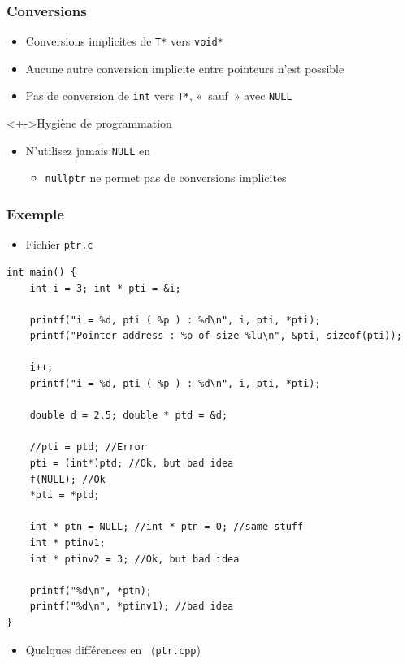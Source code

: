 \begin{frame}
\frametitle{Conversions}
\begin{itemize}[<+->]
\item Conversions implicites de \texttt{T*} vers \lstinline|void*|
\item Aucune autre conversion implicite entre pointeurs n'est possible
\item Pas de conversion de \lstinline|int| vers \texttt{T*}, «~sauf~» avec \lstinline|NULL|
\end{itemize}
\begin{block}<+->{Hygiène de programmation}
	\begin{itemize}[<+->]
	\item N'utilisez jamais \lstinline|NULL| en \cpp
		\begin{itemize}
		\item \lstinline|nullptr| ne permet pas de conversions implicites
		\end{itemize}
	\end{itemize}
\end{block}
\end{frame}

\begin{frame}[containsverbatim]
\frametitle{Exemple}
\begin{itemize}
\item Fichier \texttt{ptr.c}
\end{itemize}
\begin{lstlisting}
int main() {
    int i = 3; int * pti = &i;

    printf("i = %d, pti ( %p ) : %d\n", i, pti, *pti);
    printf("Pointer address : %p of size %lu\n", &pti, sizeof(pti));

    i++;
    printf("i = %d, pti ( %p ) : %d\n", i, pti, *pti);

    double d = 2.5; double * ptd = &d;
	
    //pti = ptd; //Error
    pti = (int*)ptd; //Ok, but bad idea
    f(NULL); //Ok
    *pti = *ptd;

    int * ptn = NULL; //int * ptn = 0; //same stuff
    int * ptinv1;
    int * ptinv2 = 3; //Ok, but bad idea

    printf("%d\n", *ptn);
    printf("%d\n", *ptinv1); //bad idea
}
\end{lstlisting}
\begin{itemize}
\item Quelques différences en \cpp\ (\texttt{ptr.cpp})
\end{itemize}
\end{frame}

